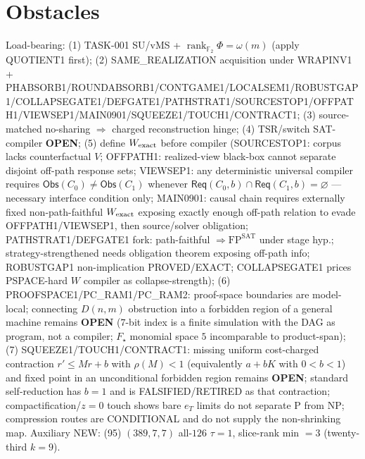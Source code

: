 \documentclass[11pt]{article}
\begin{document}
\section*{Obstacles}
Load-bearing: (1) TASK-001 SU/vMS + $\operatorname{rank}_{\mathbb F_2}\Phi=\omega(m)$ (apply QUOTIENT1 first);
(2) SAME\_REALIZATION acquisition under WRAPINV1 + PHABSORB1/ROUNDABSORB1/CONTGAME1/LOCALSEM1/ROBUSTGAP1/COLLAPSEGATE1/DEFGATE1/PATHSTRAT1/SOURCESTOP1/OFFPATH1/VIEWSEP1/MAIN0901/SQUEEZE1/TOUCH1/CONTRACT1;
(3) source-matched no-sharing $\Rightarrow$ charged reconstruction hinge;
(4) TSR/switch SAT-compiler \textbf{OPEN};
(5) define $W_{\rm exact}$ before compiler (SOURCESTOP1: corpus lacks counterfactual $V$;
OFFPATH1: realized-view black-box cannot separate disjoint off-path response sets;
VIEWSEP1: any deterministic universal compiler requires $\mathsf{Obs}(C_0)\ne\mathsf{Obs}(C_1)$
whenever $\mathsf{Req}(C_0,b)\cap\mathsf{Req}(C_1,b)=\varnothing$ --- necessary interface condition only;
MAIN0901: causal chain requires externally fixed non-path-faithful $W_{\rm exact}$ exposing
exactly enough off-path relation to evade OFFPATH1/VIEWSEP1, then source/solver obligation;
PATHSTRAT1/DEFGATE1 fork: path-faithful $\Rightarrow\mathrm{FP}^{\mathrm{SAT}}$ under stage hyp.;
strategy-strengthened needs obligation theorem exposing off-path info;
ROBUSTGAP1 non-implication PROVED/EXACT; COLLAPSEGATE1 prices PSPACE-hard $W$ compiler as collapse-strength);
(6) PROOFSPACE1/PC\_RAM1/PC\_RAM2: proof-space boundaries are model-local; connecting $D(n,m)$ obstruction into a
forbidden region of a general machine remains \textbf{OPEN} ($7$-bit index is a finite simulation with the DAG as program, not a compiler; $F_\star$ monomial space $5$ incomparable to product-span);
(7) SQUEEZE1/TOUCH1/CONTRACT1: missing uniform cost-charged contraction $r'\le Mr+b$ with $\rho(M){<}1$ (equivalently $a+bK$ with $0{<}b{<}1$) and fixed point in an unconditional forbidden region remains \textbf{OPEN};
standard self-reduction has $b{=}1$ and is FALSIFIED/RETIRED as that contraction; compactification/$z{=}0$ touch shows bare $e_T$ limits do not separate P from NP;
compression routes are CONDITIONAL and do not supply the non-shrinking map.
Auxiliary NEW: (95) $(389,7,7)$ all-$126$ $\tau{=}1$, slice-rank min $=3$ (twenty-third $k{=}9$).
\end{document}
